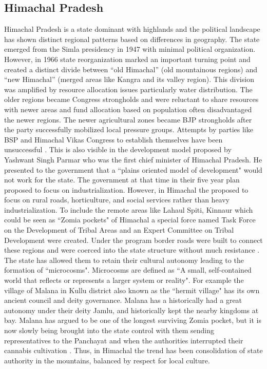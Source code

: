 \subsection{Himachal Pradesh}
\begin{sloppypar}

 Himachal Pradesh is a state dominant with highlands and the political landscape has shown distinct regional patterns based on differences in geography. The state emerged from the Simla presidency in 1947 with minimal political organization. However, in 1966 state reorganization marked an important turning point and created a distinct divide between \enquote{old Himachal} (old mountainous regions) and \enquote{new Himachal} (merged areas like Kangra and its valley region)\citep{TR_Sharma_1987}. This division was amplified by resource allocation issues particularly water distribution. The older regions became Congress strongholds and were reluctant to share resources with newer areas and fund allocation based on population often disadvantaged the newer regions. The newer agricultural zones became BJP strongholds after the party successfully mobilized local pressure groups. Attempts by parties like BSP and Himachal Vikas Congress to establish themselves have been unsuccessful \citep{chauhan2004bipolar}. This is also visible in the development model proposed by Yashwant Singh Parmar who was the first chief minister of Himachal Pradesh. He presented to the  government that a ``plains oriented model of development" would not work for the state. The  government at that time in their five year plan proposed to  focus on industrialization. However, in Himachal the proposed to focus on rural roads, horticulture, and social services rather than heavy industrialization. To include the remote areas like Lahaul Spiti, Kinnaur which could be seen as ``Zomia pockets" of Himachal a special force named Task Force on the Development of Tribal Areas and an Expert Committee on Tribal Development were created. Under the program border roads were built to connect these regions and were coerced into the state structure without much resistance \citep{StateEffectiveness2020}. The state has allowed them to retain their cultural autonomy leading to the formation of ``microcosms". Microcosms are defined as ``A small, self\hyp{}contained world that reflects or represents a larger system or reality". For example the village of Malana in Kullu district also known as the ``hermit village" has its own ancient council and deity governance. Malana has a historically had a great autonomy under their deity Jamlu, and historically  kept the nearby kingdoms at bay. Malana has argued to be one of the longest surviving Zomia pocket, but it is now slowly being brought into the state control with them sending representatives to the Panchayat and when the authorities interrupted their cannabis cultivation \citep{axelby2015hermit}. Thus, in Himachal the trend has been consolidation of state authority in the mountains, balanced by respect for local culture.

\end{sloppypar}
